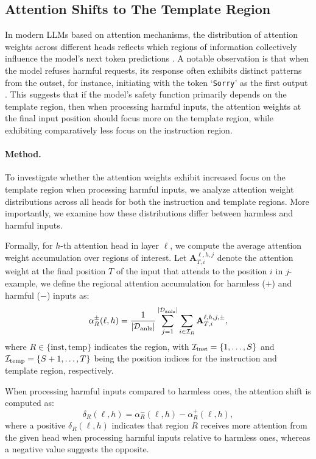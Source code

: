 \subsection{Attention Shifts to The Template Region}
\label{subsec:attn_shift}
In modern LLMs based on attention mechanisms, the distribution of attention weights across different heads reflects which regions of information collectively influence the model's next token predictions \cite{bibal2022attention}. A notable observation is that when the model refuses harmful requests, its response often exhibits distinct patterns from the outset, for instance, initiating with the token `\texttt{Sorry}' as the first output \cite{zou2023universal, qi2024safety}. 
This suggests that if the model's safety function primarily depends on the template region, then when processing harmful inputs, the attention weights at the final input position should focus more on the template region, while exhibiting comparatively less focus on the instruction region.


\paragraph{Method.}
To investigate whether the attention weights exhibit increased focus on the template region when processing harmful inputs, we analyze attention weight distributions across all heads for both the instruction and template regions. More importantly, we examine how these distributions differ between harmless and harmful inputs.

Formally, for $h$-th attention head in layer $\ell$, we compute the average attention weight accumulation over regions of interest. Let $\mathbf{A}^{\ell,h,j}_{T,i}$ denote the attention weight at the final position $T$ of the input that attends to the position $i$ in $j$-example, we define the regional attention accumulation for harmless (\(+\)) and harmful (\(-\)) inputs as:
\vspace{-0.5em}
\begin{equation}
\alpha^{\pm}_R(\ell,h) = \frac{1}{|{\mathcal{D}}_{\text{anlz}}|} \sum_{j=1}^{|{\mathcal{D}}_{\text{anlz}}|} \sum_{i \in {\mathcal{I}}_R} \mathbf{A}^{\ell,h,j,\pm}_{T,i},
\end{equation}
where $R \in \{\text{inst}, \text{temp}\}$ indicates the region, with ${\mathcal{I}}_{\text{inst}} = \{1,\dots,S\}$ and ${\mathcal{I}}_{\text{temp}} = \{S+1,\dots,T\}$ being the position indices for the instruction and template region, respectively.

When processing harmful inputs compared to harmless ones, the attention shift is computed as:
\begin{equation}
\delta_R(\ell,h) = \alpha^{-}_R(\ell,h) - \alpha^{+}_R(\ell,h),
\end{equation}
where a positive \( \delta_R(\ell,h) \) indicates that region $R$ receives more attention from the given head when processing harmful inputs relative to harmless ones, whereas a negative value suggests the opposite.


